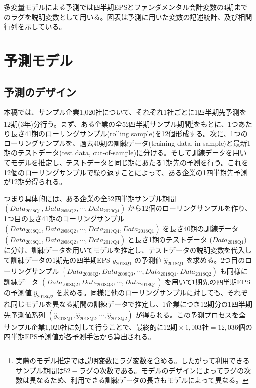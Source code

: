 \documentclass[a4paper, 12pt]{jsreport}
\begin{document}
多変量モデルによる予測では四半期EPSとファンダメンタル会計変数の4期までのラグを説明変数として用いる。図表は予測に用いた変数の記述統計、及び相関行列を示している。


    
\chapter{予測モデル}

\section{予測のデザイン}

本稿では、サンプル企業1,020社について、それぞれ1社ごとに1四半期先予測を12期(3年)分行う。まず、ある企業の全52四半期サンプル期間\footnote{実際のモデル推定では説明変数にラグ変数を含める。したがって利用できるサンプル期間は$52 - ラグの次数 $である。モデルのデザインによってラグの次数は異なるため、利用できる訓練データの長さもモデルによって異なる。}をもとに、1つあたり長さ41期のローリングサンプル(rolling sample)を12個形成する。次に、1つのローリングサンプルを、過去40期の訓練データ(training data, in-sample)と最新1期のテストデータ(test data, out-of-sample)に分ける。そして訓練データを用いてモデルを推定し、テストデータと同じ期にあたる1期先の予測を行う。これを12個のローリングサンプルで繰り返すことによって、ある企業の1四半期先予測が12期分得られる。


つまり具体的には、ある企業の全52四半期サンプル期間 $(Data_{\text{2008Q1}}, Data_{\text{2008Q2}}, \cdots, Data_{\text{2020Q4}})$ から12個のローリングサンプルを作り、1つ目の長さ41期のローリングサンプル $(Data_{\text{2008Q1}}, Data_{\text{2008Q2}}, \cdots, Data_{\text{2017Q4}}, Data_{\text{2018Q1}})$ を長さ40期の訓練データ $(Data_{\text{2008Q1}}, Data_{\text{2008Q2}}, \cdots, Data_{\text{2017Q4}})$ と長さ1期のテストデータ ($Data_{\text{2018Q1}})$ に分け、訓練データを用いてモデルを推定し、テストデータの説明変数を代入して訓練データの1期先の四半期EPS $y_{2018Q1}$ の予測値 $\hat{y}_{2018Q1}$ を求める。2つ目のローリングサンプル $(Data_{\text{2008Q2}}, Data_{\text{2008Q3}}, \cdots, Data_{\text{2018Q1}}, Data_{\text{2018Q2}})$ も同様に 訓練データ $(Data_{\text{2008Q2}}, Data_{\text{2008Q3}}, \cdots, Data_{\text{2018Q1}})$ を用いて1期先の四半期EPSの予測値 $\hat{y}_{2018Q2}$ を求める。同様に他のローリングサンプルに対しても、それぞれ同じモデルを異なる期間の訓練データで推定し、1企業につき12期分の1四半期先予測値系列 $(\hat{y}_{2018Q1}, \hat{y}_{2018Q2}, \cdots, \hat{y}_{2018Q2})$ が得られる。この予測プロセスを全サンプル企業1,020社に対して行うことで、最終的に$12期 \times 1,003社 = 12,036個$の四半期EPS予測値が各予測手法から算出される。
\end{document}

